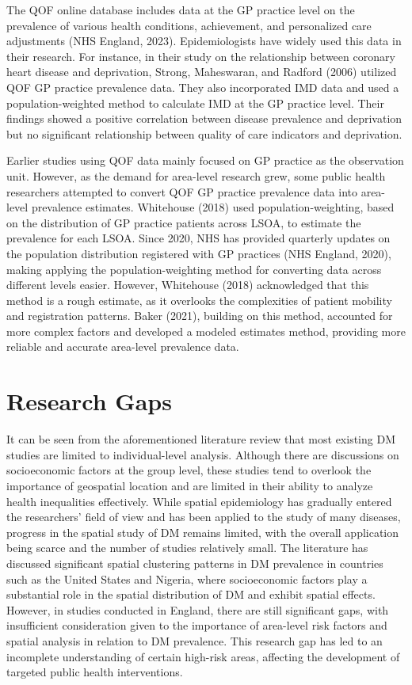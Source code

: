 The QOF online database includes data at the GP practice level on the prevalence of various health conditions, achievement, and personalized care adjustments (NHS England, 2023). Epidemiologists have widely used this data in their research. For instance, in their study on the relationship between coronary heart disease and deprivation, Strong, Maheswaran, and Radford (2006) utilized QOF GP practice prevalence data. They also incorporated IMD data and used a population-weighted method to calculate IMD at the GP practice level. Their findings showed a positive correlation between disease prevalence and deprivation but no significant relationship between quality of care indicators and deprivation.

Earlier studies using QOF data mainly focused on GP practice as the observation unit. However, as the demand for area-level research grew, some public health researchers attempted to convert QOF GP practice prevalence data into area-level prevalence estimates. Whitehouse (2018) used population-weighting, based on the distribution of GP practice patients across LSOA, to estimate the prevalence for each LSOA. Since 2020, NHS has provided quarterly updates on the population distribution registered with GP practices (NHS England, 2020), making applying the population-weighting method for converting data across different levels easier. However, Whitehouse (2018) acknowledged that this method is a rough estimate, as it overlooks the complexities of patient mobility and registration patterns. Baker (2021), building on this method, accounted for more complex factors and developed a modeled estimates method, providing more reliable and accurate area-level prevalence data.


\section{Research Gaps}
\label{sec:2.5}
It can be seen from the aforementioned literature review that most existing DM studies are limited to individual-level analysis. Although there are discussions on socioeconomic factors at the group level, these studies tend to overlook the importance of geospatial location and are limited in their ability to analyze health inequalities effectively. While spatial epidemiology has gradually entered the researchers' field of view and has been applied to the study of many diseases, progress in the spatial study of DM remains limited, with the overall application being scarce and the number of studies relatively small. The literature has discussed significant spatial clustering patterns in DM prevalence in countries such as the United States and Nigeria, where socioeconomic factors play a substantial role in the spatial distribution of DM and exhibit spatial effects. However, in studies conducted in England, there are still significant gaps, with insufficient consideration given to the importance of area-level risk factors and spatial analysis in relation to DM prevalence. This research gap has led to an incomplete understanding of certain high-risk areas, affecting the development of targeted public health interventions.

